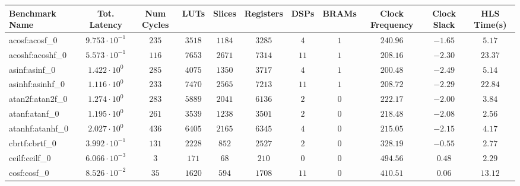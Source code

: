 \begin{tabular}{|l|c|c|c|c|c|c|c|c|c|c|}
\hline
Benchmark Name               & Tot. Latency            & Num Cycles & LUTs       & Slices    & Registers  & DSPs    & BRAMs & Clock Frequency & Clock Slack & HLS Time(s) \\
\hline
acosf:acosf\_0               & $ 9.753 \cdot 10^{-1} $ & $ 235    $ & $ 3518   $ & $ 1184  $ & $ 3285   $ & $ 4   $ & $ 1 $ & $ 240.96      $ & $ -1.65   $ & $ 5.17    $ \\
acoshf:acoshf\_0             & $ 5.573 \cdot 10^{-1} $ & $ 116    $ & $ 7653   $ & $ 2671  $ & $ 7314   $ & $ 11  $ & $ 1 $ & $ 208.16      $ & $ -2.30   $ & $ 23.37   $ \\
asinf:asinf\_0               & $ 1.422 \cdot 10^{0}  $ & $ 285    $ & $ 4075   $ & $ 1350  $ & $ 3717   $ & $ 4   $ & $ 1 $ & $ 200.48      $ & $ -2.49   $ & $ 5.14    $ \\
asinhf:asinhf\_0             & $ 1.116 \cdot 10^{0}  $ & $ 233    $ & $ 7470   $ & $ 2565  $ & $ 7213   $ & $ 11  $ & $ 1 $ & $ 208.72      $ & $ -2.29   $ & $ 22.84   $ \\
atan2f:atan2f\_0             & $ 1.274 \cdot 10^{0}  $ & $ 283    $ & $ 5889   $ & $ 2041  $ & $ 6136   $ & $ 2   $ & $ 0 $ & $ 222.17      $ & $ -2.00   $ & $ 3.84    $ \\
atanf:atanf\_0               & $ 1.195 \cdot 10^{0}  $ & $ 261    $ & $ 3539   $ & $ 1238  $ & $ 3501   $ & $ 2   $ & $ 0 $ & $ 218.48      $ & $ -2.08   $ & $ 2.56    $ \\
atanhf:atanhf\_0             & $ 2.027 \cdot 10^{0}  $ & $ 436    $ & $ 6405   $ & $ 2165  $ & $ 6345   $ & $ 4   $ & $ 0 $ & $ 215.05      $ & $ -2.15   $ & $ 4.17    $ \\
cbrtf:cbrtf\_0               & $ 3.992 \cdot 10^{-1} $ & $ 131    $ & $ 2228   $ & $ 852   $ & $ 2527   $ & $ 2   $ & $ 0 $ & $ 328.19      $ & $ -0.55   $ & $ 2.77    $ \\
ceilf:ceilf\_0               & $ 6.066 \cdot 10^{-3} $ & $ 3      $ & $ 171    $ & $ 68    $ & $ 210    $ & $ 0   $ & $ 0 $ & $ 494.56      $ & $ 0.48    $ & $ 2.29    $ \\
cosf:cosf\_0                 & $ 8.526 \cdot 10^{-2} $ & $ 35     $ & $ 1620   $ & $ 594   $ & $ 1708   $ & $ 11  $ & $ 0 $ & $ 410.51      $ & $ 0.06    $ & $ 13.12   $ \\

\end{tabular}
